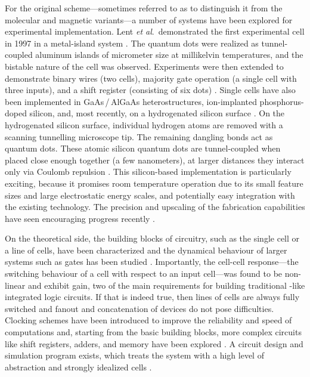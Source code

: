 For the original  scheme---sometimes referred to as  to
distinguish it from the molecular and magnetic variants---a number of systems
have been explored for experimental implementation. Lent \emph{et al}.\
demonstrated the first experimental  cell in 1997 in a metal-island
system \cite{orlov1997realization}. The quantum dots were realized as
tunnel-coupled aluminum islands of micrometer size at millikelvin temperatures,
and the bistable nature of the cell was observed. Experiments were then
extended to demonstrate binary wires (two cells), majority gate operation (a
single cell with three inputs), and a shift register (consisting of six dots)
\cite{orlov1999experimental, amlani1999digital, kummamuru2003operation}. Single
\cgls{QCA} cells have also been implemented in GaAs\,/\,AlGaAs heterostructures,
ion-implanted phosphorus-doped silicon, and, most recently, on a hydrogenated
silicon surface \cite{gardelis2003evidence, mitic2006demonstration,
haider2009controlled}. On the hydrogenated silicon surface, individual hydrogen
atoms are removed with a scanning tunnelling microscope tip. The remaining
dangling bonds act as quantum dots. These atomic silicon quantum dots are
tunnel-coupled when placed close enough together (a few nanometers), at larger
distances they interact only via Coulomb repulsion \cite{pitters2011tunnel}.
This silicon-based \cgls{QCA} implementation is particularly exciting, because
it promises room temperature operation due to its small feature sizes and large
electrostatic energy scales, and potentially easy integration with the existing
\cgls{CMOS} technology. The precision and upscaling of the fabrication
capabilities have seen encouraging progress recently \cite{wolkow2013silicon}.


\nocite{tougaw1996dynamic, toth2001role}
\nocite{tougaw1994logical, hennessy2001clocking}
%
On the theoretical side, the building blocks of  circuitry, such as
the single cell or a line of cells, have been characterized and the dynamical
behaviour of larger systems such as gates has been studied \cite{lent1993lines,
tougaw1996dynamic}. Importantly, the cell-cell response---the switching
behaviour of a cell with respect to an input cell---was found to be non-linear
and exhibit gain, two of the main requirements for building traditional
\cgls{CMOS}-like integrated logic circuits. If that is indeed true, then lines
of cells are always fully switched and fanout and concatenation of devices do not
pose difficulties. Clocking schemes have been introduced to improve the
reliability and speed of \cgls{QCA} computations and, starting from the basic
building blocks, more complex circuits like shift registers, adders, and memory
have been explored \cite{lent1997device, hennessy2001clocking,
rahimi2008quantum}. A circuit design and simulation program exists, which treats
the \cgls{QCA} system with a high level of abstraction and strongly idealized
cells \cite{walus2004qcadesigner}.

